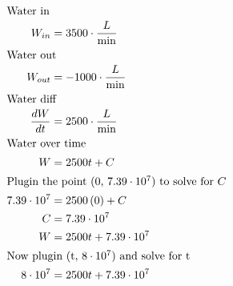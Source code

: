 \documentclass[12pt]{article}
\begin{document}
\begin{align}
  \intertext{Water in}
  W_{in}                                                                                   & =3500\cdot\frac{L}{\min}                                                                                                                                                  \\
  \intertext{Water out}
  W_{out}                                                                                  & =-1000\cdot\frac{L}{\min}                                                                                                                                                 \\
  \intertext{Water diff}
  \frac{dW}{dt}                                                                            & =2500\cdot\frac{L}{\min}                                                                                                                                                  \\
  \intertext{Water over time}
  W                                                                                        & =2500t+C                                                                                                                                                                  \\
  \intertext{Plugin the point (0, $7.39\cdot10^{7}$) to solve for $C$}
  7.39\cdot10^{7}                                                                          & =2500\left(0\right)+C                                                                                                                                                     \\
  C                                                                                        & =7.39\cdot10^{7}                                                                                                                                                          \\
  W                                                                                        & =2500t+7.39\cdot10^{7}                                                                                                                                                    \\
  \intertext{Now plugin (t, $8\cdot10^{7}$) and solve for t}
  8\cdot10^{7}                                                                             & =2500t+7.39\cdot10^{7}                                                                                                                                                    \\

\end{align}
\end{document}
